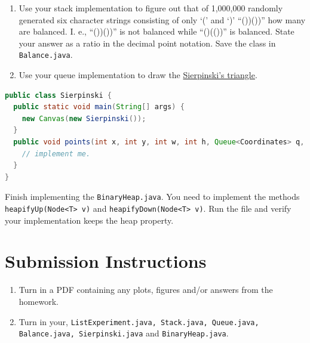 \documentclass{homework}
\begin{document}
\begin{enumerate}
  \item Use your stack implementation to figure out that of 1,000,000
        randomly generated six character strings consisting of only `('
        and `)' \eg ``())())'' how many are balanced. I. e., ``())())'' is
        not balanced while ``()(())'' is balanced. State your answer as a
        ratio in the decimal point notation. Save the class in
        \texttt{Balance.java}.
  \item Use your queue implementation to draw the
        \href{https://en.wikipedia.org/wiki/Sierpi%C5%84ski_triangle}{Sierpinski's triangle}.
\end{enumerate}


\begin{lstlisting}[language=Java]
public class Sierpinski {
  public static void main(String[] args) {
    new Canvas(new Sierpinski());
  }
  public void points(int x, int y, int w, int h, Queue<Coordinates> q, int r) {
    // implement me.
  }
}
\end{lstlisting}

\question \sloppy Finish implementing the \texttt{BinaryHeap.java}. You need to implement the methods \\
\texttt{heapifyUp(Node<T> v)} and
\texttt{heapifyDown(Node<T> v)}. Run the file and verify your implementation keeps the heap property.


\section*{Submission Instructions}

\begin{enumerate}
  \item Turn in a PDF containing any plots, figures and/or answers from
        the homework.
  \item Turn in your, \texttt{ListExperiment.java, Stack.java, Queue.java, Balance.java, Sierpinski.java} and \texttt{BinaryHeap.java}.
\end{enumerate}
\end{document}
